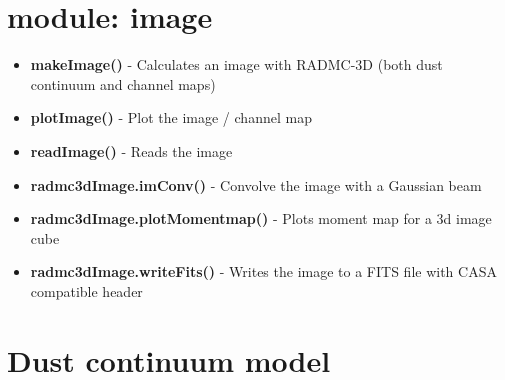 \documentclass[12pt]{article}
\begin{document}
\section*{module: image}
\begin{itemize}
\item[]{\bf makeImage()} - Calculates an image with RADMC-3D (both dust continuum and channel maps)
\item[]{\bf plotImage()} - Plot the image / channel map
\item[]{\bf readImage()} - Reads the image
\item[]{\bf radmc3dImage.imConv()} - Convolve the image with a Gaussian beam 
\item[]{\bf radmc3dImage.plotMomentmap()} - Plots moment map for a 3d image cube
\item[]{\bf radmc3dImage.writeFits()} - Writes the image to a FITS file with CASA compatible header
\end{itemize}

\newpage
\section*{Dust continuum model} 
\end{document}
